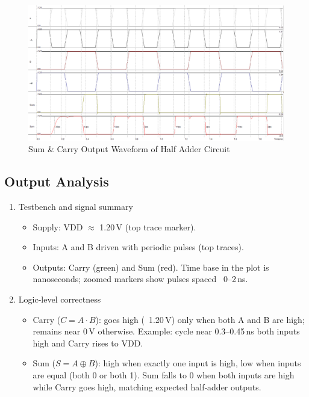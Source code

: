 \documentclass[12pt]{article}
\begin{document}
\begin{figure}[H]
  \centering
  \includegraphics[width=\textwidth]{output.png}
  \caption{Sum \& Carry Output Waveform of Half Adder Circuit}
\end{figure}

\subsection*{Output Analysis}
\begin{enumerate}
  \item Testbench and signal summary
        \begin{itemize}
          \item Supply: VDD \(\approx\) 1.20\,V (top trace marker).
          \item Inputs: A and B driven with periodic pulses (top traces).
          \item Outputs: Carry (green) and Sum (red). Time base in the plot is nanoseconds; zoomed markers show pulses spaced ~0–2\,ns.
        \end{itemize}

  \item Logic-level correctness
        \begin{itemize}
          \item Carry (\(C=A\cdot B\)): goes high (~1.20\,V) only when both A and B are high; remains near 0\,V otherwise. Example: cycle near 0.3–0.45\,ns both inputs high and Carry rises to VDD.
          \item Sum (\(S=A\oplus B\)): high when exactly one input is high, low when inputs are equal (both 0 or both 1). Sum falls to 0 when both inputs are high while Carry goes high, matching expected half‑adder outputs.
        \end{itemize}
\end{enumerate}
\end{document}
